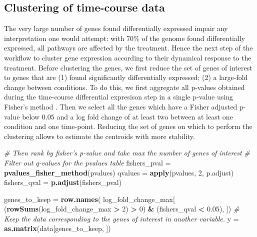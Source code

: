 \documentclass[9pt,a4paper,]{extarticle}
\newenvironment{Shaded}{\begin{snugshade}}{\end{snugshade}}
\newcommand{\CommentTok}[1]{\textcolor[rgb]{0.56,0.35,0.01}{\textit{#1}}}
\newcommand{\DecValTok}[1]{\textcolor[rgb]{0.00,0.00,0.81}{#1}}
\newcommand{\FloatTok}[1]{\textcolor[rgb]{0.00,0.00,0.81}{#1}}
\newcommand{\KeywordTok}[1]{\textcolor[rgb]{0.13,0.29,0.53}{\textbf{#1}}}
\newcommand{\NormalTok}[1]{#1}
\newcommand{\OperatorTok}[1]{\textcolor[rgb]{0.81,0.36,0.00}{\textbf{#1}}}
\newcommand{\StringTok}[1]{\textcolor[rgb]{0.31,0.60,0.02}{#1}}
\begin{document}
\hypertarget{clustering-of-time-course-data}{%
\subsection{Clustering of time-course data}\label{clustering-of-time-course-data}}

The very large number of genes found differentially expressed impair any
interpretation one would attempt: with 70\% of the genome found differentially
expressed, all pathways are affected by the treatment. Hence the next step of
the workflow to cluster gene expression according to their dynamical response
to the treatment. Before clustering the genes, we first reduce the set of
genes of interest to genes that are (1) found significantly differentially
expressed; (2) a large-fold change between conditions. To do this, we first
aggregate all p-values obtained during the time-course differential expresison
step in a single p-value using Fisher's method \citep{fisher:statistical}. Then we
select all the genes which have a Fisher adjusted p-value below 0.05 and a log
fold change of at least two between at least one condition and one time-point.
Reducing the set of genes on which to perform the clustering allows to
estimate the centroids with more stability.

\begin{Shaded}
\begin{Highlighting}[]
\CommentTok{# Then rank by fisher's p-value and take max the number of genes of interest}
\CommentTok{# Filter out q-values for the pvalues table}
\NormalTok{fishers_pval =}\StringTok{ }\KeywordTok{pvalues_fisher_method}\NormalTok{(pvalues)}
\NormalTok{qvalues =}\StringTok{ }\KeywordTok{apply}\NormalTok{(pvalues, }\DecValTok{2}\NormalTok{, p.adjust)}
\NormalTok{fishers_qval =}\StringTok{ }\KeywordTok{p.adjust}\NormalTok{(fishers_pval)}

\NormalTok{genes_to_keep =}\StringTok{ }\KeywordTok{row.names}\NormalTok{(}
\NormalTok{    log_fold_change_max[}
\NormalTok{    (}\KeywordTok{rowSums}\NormalTok{(log_fold_change_max }\OperatorTok{>}\StringTok{ }\DecValTok{2}\NormalTok{) }\OperatorTok{>}\StringTok{ }\DecValTok{0}\NormalTok{) }\OperatorTok{&}
\StringTok{    }\NormalTok{(fishers_qval }\OperatorTok{<}\StringTok{ }\FloatTok{0.05}\NormalTok{), ])}
\CommentTok{# Keep the data corresponding to the genes of interest in another variable.}
\NormalTok{y =}\StringTok{ }\KeywordTok{as.matrix}\NormalTok{(data[genes_to_keep, ])}
\end{Highlighting}
\end{Shaded}
\end{document}

